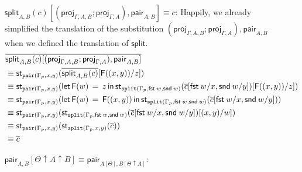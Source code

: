 \documentclass[10pt]{article}
\theoremstyle{definition}
\newcommand\dsd[1]{\ensuremath{\mathsf{#1}}}
\newcommand\StI[2]{\ensuremath{\mathsf{st}_{#1}(#2)}}
\newcommand\FE[3]{\ensuremath{\mathsf{let} \, \mathsf{F}(#2) \, = \, {#1} \, \mathsf{in} \, #3}}
\newcommand\FI[1]{\ensuremath{\mathsf{F}{(#1)}}}
\newcommand\proj[1]{\ensuremath{\mathsf{proj}_{#1}}}
\newcommand{\app}[2]{\ensuremath{#1 \: #2}}
\newcommand{\fst}[1]{\app{\dsd{fst}}{#1}}
\newcommand{\snd}[1]{\app{\dsd{snd}}{#1}}
\begin{document}
\begin{enumerate}[style = multiline, labelwidth = 80pt]
\item[{$\mathsf{split}_{A,B}(c)\allowbreak[(\proj{\Gamma, A, B};\proj{\Gamma, A}), \allowbreak\mathsf{pair}_{A,B}] \equiv c$}:] Happily, we already simplified the translation of the substitution $(\proj{\Gamma, A, B};\proj{\Gamma, A}), \mathsf{pair}_{A,B}$ when we defined the translation of $\mathsf{split}$.
\begin{align*}
&\upstairs{\mathsf{split}_{A,B}(c)[(\proj{\Gamma, A, B};\proj{\Gamma, A}), \mathsf{pair}_{A,B}]} \\
&\equiv \StI{\mathtt{pair}(\asdep{\Gamma},x,y)}{\upstairs{\mathsf{split}_{A,B}(c)}[\FI{(x, y)}/z]} \\
&\equiv \StI{\mathtt{pair}(\asdep{\Gamma},x,y)}{\FE{z}{w}{\StI{\mathtt{split}(\asdep{\Gamma},\fst w,\snd w)}{\upstairs{c}[\fst w / x, \snd w / y]}}[\FI{(x, y)}/z]} \\
&\equiv \StI{\mathtt{pair}(\asdep{\Gamma},x,y)}{\FE{\FI{(x, y)}}{w}{\StI{\mathtt{split}(\asdep{\Gamma},\fst w,\snd w)}{\upstairs{c}[\fst w / x, \snd w / y]}}} \\
&\equiv \StI{\mathtt{pair}(\asdep{\Gamma},x,y)}{\StI{\mathtt{split}(\asdep{\Gamma},\fst w,\snd w)}{\upstairs{c}[\fst w / x, \snd w / y]}[(x,y)/w]} \\
&\equiv \StI{\mathtt{pair}(\asdep{\Gamma},x,y)}{\StI{\mathtt{split}(\asdep{\Gamma},x,y)}{\upstairs{c}}} \\
&\equiv \upstairs{c} \\
\end{align*}

\item[{$\mathsf{pair}_{A, B}[\Theta \uparrow A \uparrow B] \equiv \mathsf{pair}_{A[\Theta], B[\Theta \uparrow A]}$}:]


\end{enumerate}
\end{document}
